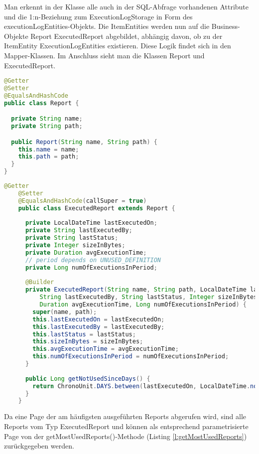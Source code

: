 Man erkennt in der Klasse alle auch in der SQL-Abfrage vorhandenen Attribute und die 1:n-Beziehung zum ExecutionLogStorage in Form des executionLogEntities-Objekts. Die ItemEntities werden nun auf die Business-Objekte Report \bzw ExecutedReport abgebildet, abhängig davon, ob zu der ItemEntity ExecutionLogEntities existieren. Diese Logik findet sich in den Mapper-Klassen. Im Anschluss sieht man die Klassen Report und ExecutedReport.
\begin{lstlisting}[language=Java,caption={Report}]
@Getter
@Setter
@EqualsAndHashCode
public class Report {

  private String name;
  private String path;

  public Report(String name, String path) {
    this.name = name;
    this.path = path;
  }
}
\end{lstlisting}
\begin{lstlisting}[language=Java,caption={ExecutedReport}]
	@Getter
	@Setter
	@EqualsAndHashCode(callSuper = true)
	public class ExecutedReport extends Report {
	
	  private LocalDateTime lastExecutedOn;
	  private String lastExecutedBy;
	  private String lastStatus;
	  private Integer sizeInBytes;
	  private Duration avgExecutionTime;
	  // period depends on UNUSED_DEFINITION
	  private Long numOfExecutionsInPeriod;
	
	  @Builder
	  private ExecutedReport(String name, String path, LocalDateTime lastExecutedOn,
		  String lastExecutedBy, String lastStatus, Integer sizeInBytes,
		  Duration avgExecutionTime, Long numOfExecutionsInPeriod) {
		super(name, path);
		this.lastExecutedOn = lastExecutedOn;
		this.lastExecutedBy = lastExecutedBy;
		this.lastStatus = lastStatus;
		this.sizeInBytes = sizeInBytes;
		this.avgExecutionTime = avgExecutionTime;
		this.numOfExecutionsInPeriod = numOfExecutionsInPeriod;
	  }
	
	  public Long getNotUsedSinceDays() {
		return ChronoUnit.DAYS.between(lastExecutedOn, LocalDateTime.now());
	  }
	}
\end{lstlisting}
Da eine Page der am häufigsten ausgeführten Reports abgerufen wird, sind alle Reports vom Typ ExecutedReport und können als entsprechend parametrisierte Page von der get\-Most\-Used\-Reports()-Methode (Listing \ref{l:getMostUsedReports}) zurückgegeben werden.

